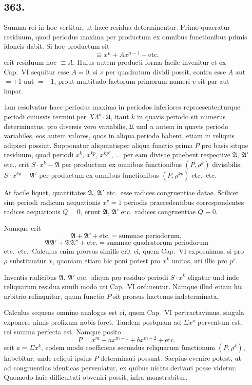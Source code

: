 \documentclass[12pt,a4paper]{article}
\begin{document}
\subsection*{363.}

Summa rei in hoc vertitur, ut haec residua determinentur. Primo quaeratur residuum, quod periodus maxima per productum ex omnibus functionibus primis idoneis dabit. Si hoc productum sit
\[
\equiv x^{\mu}+Ax^{\mu-1}+\text{etc.}
\]
erit residuum hoc $\equiv A$. Huius autem producti forma facile invenitur et ex Cap.~VI sequitur esse $A=0$, si $v$ per quadratum dividi possit, contra esse $A$ aut $=+1$ aut $=-1$, prout multitudo factorum primorum numeri $v$ sit par aut impar.

Iam resolvatur haec periodus maxima in periodos inferiores repraesententurque periodi cuiusvis termini per $X\Lambda^k\cdot\mathfrak{U}$, itaut $k$ in quavis periodo sit numerus determinatus, pro diversis vero variabilis, $\mathfrak{U}$ und $u$ autem in quavis periodo variabiles, eos autem valores, quos in aliqua periodo habent, etiam in reliquis adipisci possint. Supponatur aliquantisper aliqua functio prima $P$ pro basis sitque residuum, quod periodi $x^k$, $x^{kp}$, $x^{kp^2}$, $\ldots$ per eam divisae praebent respective $\mathfrak{A}$, $\mathfrak{A}'$ etc., erit $S\cdot x^k-\mathfrak{A}$ per productum ex omnibus functionibus $(P,\rho^k)$ divisibilis. $S\cdot x^{kp}-\mathfrak{A}'$ per productum ex omnibus functionibus $(P,\rho^{kp})$ etc.~etc.

At facile liquet, quantitates $\mathfrak{A}$, $\mathfrak{A}'$ etc.~esse radices congruentiae datae. Scilicet sint periodi radicum aequationis $x^v=1$ periodis praecedentibus correspondentes radices aequationis $Q=0$, erunt $\mathfrak{A}$, $\mathfrak{A}'$ etc.~radices congruentiae $Q\equiv 0$.

Namque erit
\[
\mathfrak{A}+\mathfrak{A}'+\text{etc.} = \text{summae periodorum},
\]
\[
\mathfrak{A}\mathfrak{A}'+\mathfrak{A}\mathfrak{A}''+\text{etc.} = \text{summae quadratorum periodorum}
\]
etc.~etc.~Calculus enim prorsus similis erit ei, quem Cap.~VI exposuimus, si pro $\rho$ substituatur $x$, quoniam etiam hic poni potest pro $x^k$ unitas, uti illic pro $p^v$.

Inventis radicibus $\mathfrak{A}$, $\mathfrak{A}'$ etc.~aliqua pro residuo periodi $S\cdot x^k$ eligatur und inde reliquarum residua simili modo uti Cap.~VI ordinentur. Namque illud etiam hic arbitrio relinquitur, quum functio $P$ sit prorsus hactenus indeterminata.

Calculus sequens omnino analogus est ei, quem Cap.~VI pertractavimus, singula exponere nimis prolixum nobis foret. Tandem postquam ad $\Sigma x^p$ perventum est, rei summa perfecta est. Namque posito
\[
P = x^m + ax^{m-1} + bx^{m-2} + \text{etc.}
\]
erit $a=\Sigma x^k$, eodem modo coefficiens secundus reliquarum functionum $(P,\rho^k)$, habebitur, unde reliqui ipsius $P$ determinari possunt. Saepius evenire potest, ut ad congruentias identicas perveniatur, ex quibus nichts derivari posse videtur. Quomodo huic difficultati obveniri possit, infra monstrabitur.
\end{document}
